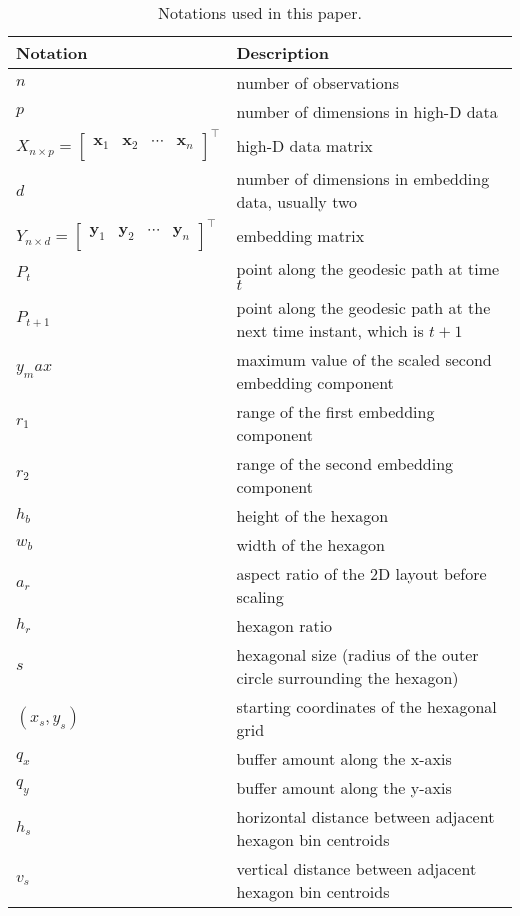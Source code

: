 \documentclass[
  12pt]{article}
\begin{document}
\begin{table}

\caption{\label{tab:tbl-notations}Notations used in this paper.}
\centering
\begin{tabular}[t]{ll}
\toprule
\textbf{Notation} & \textbf{Description}\\
\midrule
$n$ & number of observations\\
$p$ & number of dimensions in high-D data\\
$X_{n \times p} = \begin{bmatrix} \textbf{x} _{1} & \textbf{x}_ {2} & \cdots & \textbf{x}_{n} \\  \end{bmatrix}^\top$ & high-D data matrix\\
$d$ & number of dimensions in embedding data, usually two\\
$Y_{n \times d} = \begin{bmatrix} \textbf{y} _{1} & \textbf{y}_ {2} & \cdots & \textbf{y}_{n} \\  \end{bmatrix}^\top$ & embedding matrix\\
\addlinespace
$P_t$ & point along the geodesic path at time $t$\\
$P_{t+1}$ & point along the geodesic path at the next time instant, which is $t+1$\\
$y_max$ & maximum value of the scaled second embedding component\\
$r_1$ & range of the first embedding component\\
$r_2$ & range of the second embedding component\\
\addlinespace
$h_b$ & height of the hexagon\\
$w_b$ & width of the hexagon\\
$a_r$ & aspect ratio of the 2D layout before scaling\\
$h_r$ & hexagon ratio\\
$s$ & hexagonal size (radius of the outer circle surrounding the hexagon)\\
\addlinespace
$(x_s, y_s)$ & starting coordinates of the hexagonal grid\\
$q_x$ & buffer amount along the x-axis\\
$q_y$ & buffer amount along the y-axis\\
$h_s$ & horizontal distance between 
adjacent hexagon bin \vphantom{1} centroids\\
$v_s$ & vertical distance between 
adjacent hexagon bin centroids\\

\end{tabular}
\end{table}
\end{document}
